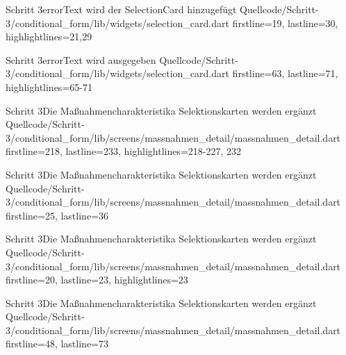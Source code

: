 \begin{alexlisting}{Schritt 3}{errorText wird der SelectionCard hinzugefügt}
    {Quellcode/Schritt-3/conditional_form/lib/widgets/selection_card.dart}
    {firstline=19, lastline=30, highlightlines={21,29}}
    \label{lst:Schritt3DieMassnahmencharakteristikaSelektionskartenWerdenergaenzt}
\end{alexlisting}

\begin{alexlisting}{Schritt 3}{errorText wird ausgegeben}
    {Quellcode/Schritt-3/conditional_form/lib/widgets/selection_card.dart}
    {firstline=63, lastline=71, highlightlines={65-71}}
    \label{lst:Schritt3DieMassnahmencharakteristikaSelektionskartenWerdenergaenzt}
\end{alexlisting}

\begin{alexlisting}{Schritt 3}{Die Maßnahmencharakteristika Selektionskarten werden ergänzt}
    {Quellcode/Schritt-3/conditional_form/lib/screens/massnahmen_detail/massnahmen_detail.dart}
    {firstline=218, lastline=233, highlightlines={218-227, 232}}
    \label{lst:Schritt3DieMassnahmencharakteristikaSelektionskartenWerdenergaenzt}
\end{alexlisting}

\begin{alexlisting}{Schritt 3}{Die Maßnahmencharakteristika Selektionskarten werden ergänzt}
    {Quellcode/Schritt-3/conditional_form/lib/screens/massnahmen_detail/massnahmen_detail.dart}
    {firstline=25, lastline=36}
    \label{lst:Schritt3DieMassnahmencharakteristikaSelektionskartenWerdenergaenzt}
\end{alexlisting}

\begin{alexlisting}{Schritt 3}{Die Maßnahmencharakteristika Selektionskarten werden ergänzt}
    {Quellcode/Schritt-3/conditional_form/lib/screens/massnahmen_detail/massnahmen_detail.dart}
    {firstline=20, lastline=23, highlightlines={23}}
    \label{lst:Schritt3DieMassnahmencharakteristikaSelektionskartenWerdenergaenzt}
\end{alexlisting}


\begin{alexlisting}{Schritt 3}{Die Maßnahmencharakteristika Selektionskarten werden ergänzt}
    {Quellcode/Schritt-3/conditional_form/lib/screens/massnahmen_detail/massnahmen_detail.dart}
    {firstline=48, lastline=73}
    \label{lst:Schritt3DieMassnahmencharakteristikaSelektionskartenWerdenergaenzt}
\end{alexlisting}


